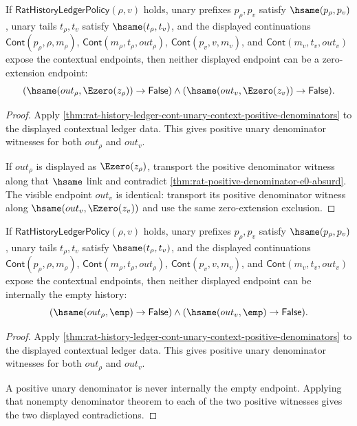 \begin{theorem}
\label{thm:rat-history-ledger-cont-unary-context-e0-endpoint-absurd}
If $\mathsf{RatHistoryLedgerPolicy}(\rho,v)$ holds, unary prefixes
$p_\rho,p_v$ satisfy $\hsame(p_\rho,p_v)$, unary tails $t_\rho,t_v$ satisfy
$\hsame(t_\rho,t_v)$, and the displayed continuations
$\mathsf{Cont}(p_\rho,\rho,m_\rho)$,
$\mathsf{Cont}(m_\rho,t_\rho,out_\rho)$,
$\mathsf{Cont}(p_v,v,m_v)$, and
$\mathsf{Cont}(m_v,t_v,out_v)$ expose the contextual endpoints, then neither
displayed endpoint can be a zero-extension endpoint:
$$
(\hsame(out_\rho,\Ezero(z_\rho))\to\mathsf{False})\land
(\hsame(out_v,\Ezero(z_v))\to\mathsf{False}).
$$
\end{theorem}
\begin{proof}
Apply
\autoref{thm:rat-history-ledger-cont-unary-context-positive-denominators} to
the displayed contextual ledger data. This gives positive unary denominator
witnesses for both $out_\rho$ and $out_v$.

If $out_\rho$ is displayed as $\Ezero(z_\rho)$, transport the positive
denominator witness along that $\hsame$ link and contradict
\autoref{thm:rat-positive-denominator-e0-absurd}. The visible endpoint
$out_v$ is identical: transport its positive denominator witness along
$\hsame(out_v,\Ezero(z_v))$ and use the same zero-extension exclusion.
\end{proof}

\begin{theorem}
\label{thm:rat-ledger-cont-unary-context-empty-endpoint-absurd}
If $\mathsf{RatHistoryLedgerPolicy}(\rho,v)$ holds, unary prefixes
$p_\rho,p_v$ satisfy $\hsame(p_\rho,p_v)$, unary tails $t_\rho,t_v$ satisfy
$\hsame(t_\rho,t_v)$, and the displayed continuations
$\mathsf{Cont}(p_\rho,\rho,m_\rho)$,
$\mathsf{Cont}(m_\rho,t_\rho,out_\rho)$,
$\mathsf{Cont}(p_v,v,m_v)$, and
$\mathsf{Cont}(m_v,t_v,out_v)$ expose the contextual endpoints, then neither
displayed endpoint can be internally the empty history:
$$
(\hsame(out_\rho,\emp)\to\mathsf{False})\land
(\hsame(out_v,\emp)\to\mathsf{False}).
$$
\end{theorem}
\begin{proof}
Apply
\autoref{thm:rat-history-ledger-cont-unary-context-positive-denominators} to
the displayed contextual ledger data. This gives positive unary denominator
witnesses for both $out_\rho$ and $out_v$.

A positive unary denominator is never internally the empty endpoint. Applying
that nonempty denominator theorem to each of the two positive witnesses gives
the two displayed contradictions.
\end{proof}

